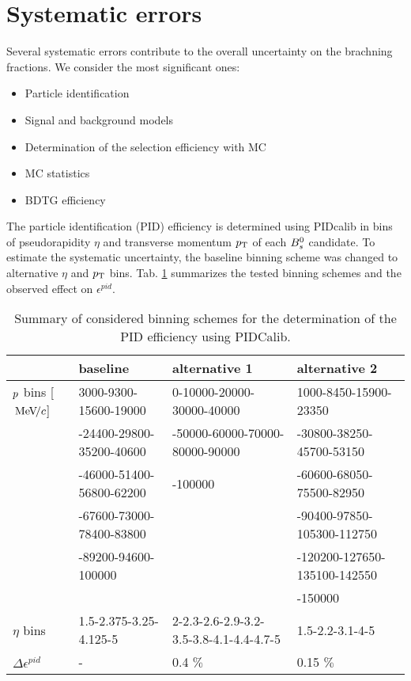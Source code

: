 \section{Systematic errors}
\label{sec: systematics}

Several systematic errors contribute to the overall uncertainty on the brachning fractions. We consider the most significant ones:

\begin{itemize}

\item Particle identification

\item Signal and background models

\item Determination of the selection efficiency with MC

\item MC statistics

\item BDTG efficiency

\end{itemize} 

The particle identification (PID) efficiency is determined using PIDcalib in bins of pseudorapidity $\eta$ and transverse momentum $\mbox{$p_{\mathrm{ T}}$}$ of each ${{B}^0_{s}}$ candidate. 
To estimate the systematic uncertainty, the baseline binning scheme was changed to alternative $\eta$ and $\mbox{$p_{\mathrm{ T}}$}$ bins. 
Tab. \ref{tab: PIDbinning} summarizes the tested binning schemes and the observed effect on $\epsilon^{pid}$. 

\begin{table}[h]
\centering
\begin{tabular}{l l l l}
 & baseline & alternative 1 & alternative 2\\
\hline
$\mbox{$p$}$ bins [${\mathrm{\,Me\kern -0.1em V\!/}c}$] & \scriptsize 3000-9300-15600-19000&\scriptsize 0-10000-20000-30000-40000&\scriptsize 1000-8450-15900-23350\\&\scriptsize-24400-29800-35200-40600&\scriptsize-50000-60000-70000-80000-90000&\scriptsize-30800-38250-45700-53150\\&\scriptsize-46000-51400-56800-62200&\scriptsize-100000&\scriptsize-60600-68050-75500-82950\\&\scriptsize-67600-73000-78400-83800&&\scriptsize-90400-97850-105300-112750\\&\scriptsize-89200-94600-100000&&\scriptsize-120200-127650-135100-142550\\&&&\scriptsize-150000\normalsize\\
\hline
$\eta$ bins  &\scriptsize 1.5-2.375-3.25-4.125-5 &\scriptsize 2-2.3-2.6-2.9-3.2-3.5-3.8-4.1-4.4-4.7-5 & \scriptsize 1.5-2.2-3.1-4-5\normalsize\\
\hline \hline
$\Delta\epsilon^{pid}$      & - & 0.4 $\%$ & 0.15 $\%$\\
\end{tabular}
\caption{Summary of considered binning schemes for the determination of the PID efficiency using PIDCalib.}
\label{tab: PIDbinning}
\end{table}


